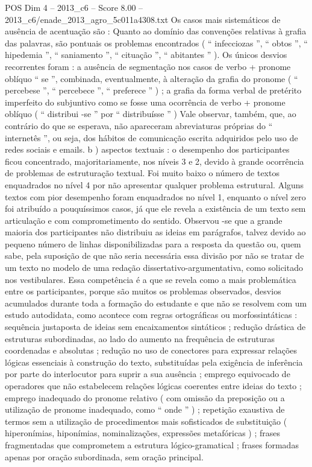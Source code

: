 \begin{textsample}{POS Dim 4 – 2013\_c6 – Score 8.00 – 2013\_c6/enade\_2013\_agro\_5c011a4308.txt}
Os casos mais sistemáticos de ausência de acentuação são : Quanto ao domínio das convenções relativas à grafia das palavras, são pontuais os problemas encontrados ( “ infecciozas ”, “ obtos ”, “ hipedemia ”, “ saniamento ”, “ cituação ”, “ abitantes ” ).
Os únicos desvios recorrentes foram : a ausência de segmentação nos casos de verbo + pronome oblíquo “ se ”, combinada, eventualmente, à alteração da grafia do pronome ( “ percebese ”, “ percebece ”, “ preferece ” ) ; a grafia da forma verbal de pretérito imperfeito do subjuntivo como se fosse uma ocorrência de verbo + pronome oblíquo ( “ distribui -se ” por “ distribuísse ” ) Vale observar, também, que, ao contrário do que se esperava, não apareceram abreviaturas próprias do “ internetês ”, ou seja, dos hábitos de comunicação escrita adquiridos pelo uso de redes sociais e emails. b ) aspectos textuais : o desempenho dos participantes ficou concentrado, majoritariamente, nos níveis 3 e 2, devido à grande ocorrência de problemas de estruturação textual.
Foi muito baixo o número de textos enquadrados no nível 4 por não apresentar qualquer problema estrutural.
Alguns textos com pior desempenho foram enquadrados no nível 1, enquanto o nível zero foi atribuído a pouquíssimos casos, já que ele revela a existência de um texto sem articulação e com comprometimento do sentido.
Observou -se que a grande maioria dos participantes não distribuiu as ideias em parágrafos, talvez devido ao pequeno número de linhas disponibilizadas para a resposta da questão ou, quem sabe, pela suposição de que não seria necessária essa divisão por não se tratar de um texto no modelo de uma redação dissertativo-argumentativa, como solicitado nos vestibulares.
Essa competência é a que se revela como a mais problemática entre os participantes, porque são muitos os problemas observados, desvios acumulados durante toda a formação do estudante e que não se resolvem com um estudo autodidata, como acontece com regras ortográficas ou morfossintáticas : sequência justaposta de ideias sem encaixamentos sintáticos ; redução drástica de estruturas subordinadas, ao lado do aumento na frequência de estruturas coordenadas e absolutas ; redução no uso de conectores para expressar relações lógicas essenciais à construção do texto, substituídas pela exigência de inferência por parte do interlocutor para suprir a sua ausência ; emprego equivocado de operadores que não estabelecem relações lógicas coerentes entre ideias do texto ; emprego inadequado do pronome relativo ( com omissão da preposição ou a utilização de pronome inadequado, como “ onde ” ) ; repetição exaustiva de termos sem a utilização de procedimentos mais sofisticados de substituição ( hiperonímias, hiponímias, nominalizações, expressões metafóricas ) ; frases fragmentadas que comprometem a estrutura lógico-gramatical ; frases formadas apenas por oração subordinada, sem oração principal.

\end{textsample}
